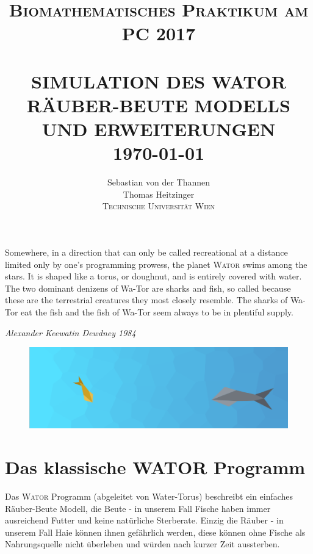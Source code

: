 \documentclass[a4paper,11pt]{article}
\title{ \normalsize \textsc{Biomathematisches Praktikum am PC 2017}    %
            \\[3.0cm]                   %
            \HRule{1pt} \\ [0.5cm]      %
            \LARGE \textbf{\uppercase{Simulation des WATOR Räuber-Beute Modells und Erweiterungen}}    %
            \HRule{1pt} \\ [0.5cm]      %
            \normalsize \today          %
        }
\author{
	        Sebastian von der Thannen\\
	        Thomas Heitzinger\\
	        \vspace{10mm}
	        \textsc{Technische Universität Wien}\\
	}
\makeatletter
\newcommand{\wator}{\textsc{Wator }}
\theoremstyle{definition}
\numberwithin{equation}{section}
\def\printtitle{%
    {\centering \@title\par}}
\def\printauthor{%
    {\centering \large \@author}}
\makeatother
\begin{document}
	\thispagestyle{empty}       %

	\printtitle                 %
	\vfill
	\printauthor                %
	\newpage
	
	
	\epigraph{
		Somewhere, in a direction that can only be called recreational at a distance limited only by one's programming prowess, the planet \wator swims among the stars. It is shaped like a torus, or doughnut, and is entirely covered with water. The two dominant denizens of Wa-Tor are sharks and fish, so called because these are the terrestrial creatures they most closely resemble. The sharks of Wa-Tor eat the fish and the fish of Wa-Tor seem always to be in plentiful supply.
	}{\textit{Alexander Keewatin Dewdney 1984}}

	\begin{figure}[H]
		\centering
		\includegraphics[width=1\textwidth]{pictures/encounter.png}
		\label{fig:encounter}
	\end{figure}

	\section{Das klassische WATOR Programm}

	Das \wator Programm (abgeleitet von Water-Torus) beschreibt ein einfaches Räuber-Beute Modell, die Beute - in unserem Fall Fische haben immer ausreichend Futter und keine natürliche Sterberate. Einzig die Räuber - in unserem Fall Haie können ihnen gefährlich werden, diese können ohne Fische als Nahrungsquelle nicht überleben und würden nach kurzer Zeit aussterben. \newline
\end{document}
